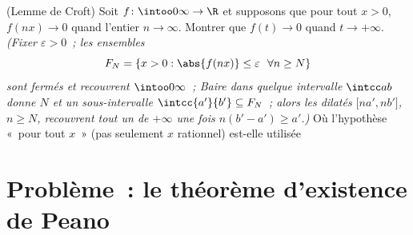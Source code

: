 \begin{exercise}[$\star\star\star$]\label{exo:b3:complete:12}
(Lemme de Croft) Soit $f\colon\intoo0\infty\to\R$  et
supposons que pour tout $x > 0$, $f(nx) \to 0$ quand l'entier
$n \to \infty$. Montrer que $f(t) \to 0$ quand $t \to
+\infty$. \emph{(Fixer $\varepsilon > 0$~; les ensembles
\[
F_N = \{x > 0 : \abs{f(nx)} \leq \varepsilon\ \ \forall n
\geq N\}
\]
sont fermés et recouvrent $\intoo0\infty$~; Baire dans quelque
intervalle $\intcc ab$ donne $N$ et un sous-intervalle
$\intcc{a'}{b'} \subseteq F_N$~; alors les dilatés
$\bigl[na', nb'\bigr]$, $n \geq N$, recouvrent tout un
 de $+\infty$ une fois $n(b' - a') \geq a'$.)} Où
l'hypothèse «~pour tout $x$~» (pas seulement $x$ rationnel)
est-elle utilisée~
\end{exercise}

\section{Problème~: le théorème d'existence de Peano}

